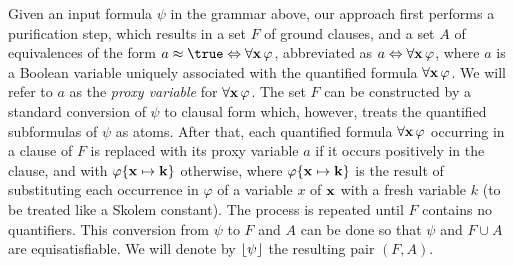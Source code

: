 \documentclass{svjour3}                     %
\begin{document}
Given an input formula $\psi$ in the grammar above,
our approach first performs a purification step,
which results in a set $F$ of ground clauses, and 
a set $A$ of equivalences of the form $a \teq \true \liff \forall \tupl{x}\, \varphi$,
abbreviated as $a \Leftrightarrow \forall \mathbf{x}\, \varphi$,
where $a$ is a Boolean variable uniquely associated 
with the quantified formula $\forall \mathbf{x}\, \varphi$.
We will refer to $a$ as the \emph{proxy variable} for $\forall \mathbf{x}\, \varphi$.
The set $F$ can be constructed by a standard conversion of $\psi$ to clausal form
which, however, treats the quantified subformulas of $\psi$ as atoms.
After that, each quantified formula $\forall \mathbf{x}\, \varphi$ occurring in a clause of $F$ 
is replaced with its proxy variable $a$ if it occurs positively in the clause, and 
with $\varphi\{ \mathbf{x} \mapsto \mathbf{k} \}$ otherwise,
where $\varphi\{ \mathbf{x} \mapsto \mathbf{k} \}$ is the result of 
substituting each occurrence in $\varphi$ of a variable $x$ of $\mathbf{x}$ 
with a fresh variable $k$ (to be treated like a Skolem constant).
The process is repeated until $F$ contains no quantifiers.
This conversion from $\psi$ to $F$ and $A$ can be done so that 
$\psi$ and $F \cup A$ are equisatisfiable.
We will denote by $\lfloor \psi \rfloor$ the resulting pair $( F, A )$.
\end{document}
